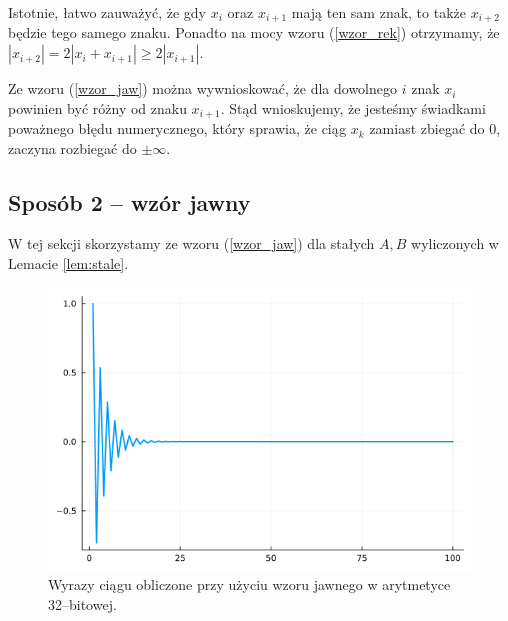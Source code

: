 \documentclass{article}
\begin{document}
Istotnie, łatwo zauważyć, że gdy \(x_i\) oraz \(x_{i+1}\) mają ten sam znak, to także \(x_{i+2}\) będzie tego samego znaku. Ponadto na mocy wzoru (\ref{wzor_rek}) otrzymamy, że 
\(\left| x_{i+2} \right| = 2\left| x_{i} + x_{i+1} \right| \geq 2 \left| x_{i+1} \right|\).

Ze wzoru (\ref{wzor_jaw}) można wywnioskować, że dla dowolnego \(i\) znak \(x_i\) powinien być różny od znaku \(x_{i+1}\). Stąd wnioskujemy, że jesteśmy świadkami poważnego błędu numerycznego, który sprawia, że ciąg \(x_k\) zamiast zbiegać do 0, zaczyna rozbiegać do \(\pm \infty\).

\newpage

\subsection{Sposób 2 -- wzór jawny}

W tej sekcji skorzystamy ze wzoru (\ref{wzor_jaw}) dla stałych \(A,B\) wyliczonych w Lemacie \ref{lem:stale}.


\begin{figure}[!h]
    \centering
    \includegraphics[scale=0.4]{plot32_2.png}
    \caption{Wyrazy ciągu obliczone przy użyciu wzoru jawnego w arytmetyce 32--bitowej.}
    \label{fig:plot32_2}
\end{figure}
\end{document}
